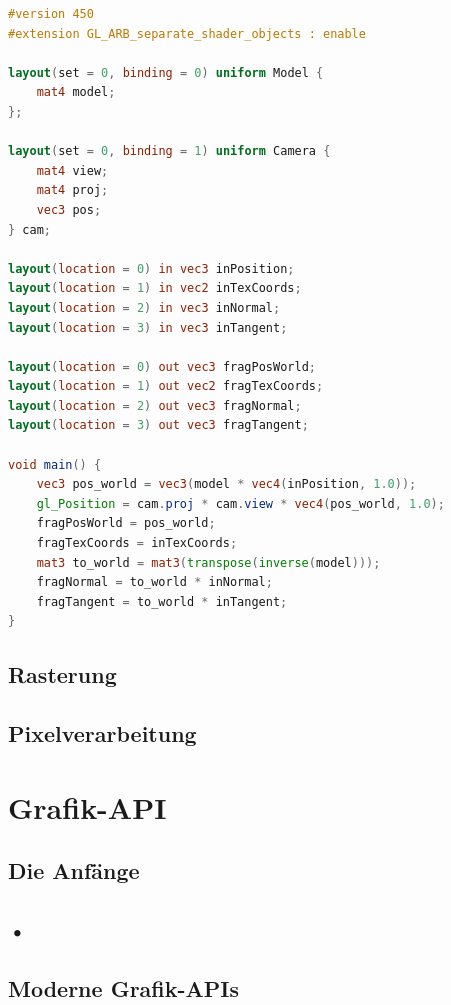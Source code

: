 \documentclass[oneside]{ausarbeitung}
\newcommand*{\quotize}[1]{\glqq #1\grqq}
\begin{document}
\begin{minipage}{\textwidth}
\begin{lstlisting}[language=GLSL, label={lst:vertex_shader}, caption={Beispiel eines Vertex Shaders in \ac{GLSL}, welcher so in der \textbf{spider}-Engine verwendet wird}]
#version 450
#extension GL_ARB_separate_shader_objects : enable

layout(set = 0, binding = 0) uniform Model {
    mat4 model;
};

layout(set = 0, binding = 1) uniform Camera {
    mat4 view;
    mat4 proj;
    vec3 pos;
} cam;

layout(location = 0) in vec3 inPosition;
layout(location = 1) in vec2 inTexCoords;
layout(location = 2) in vec3 inNormal;
layout(location = 3) in vec3 inTangent;

layout(location = 0) out vec3 fragPosWorld;
layout(location = 1) out vec2 fragTexCoords;
layout(location = 2) out vec3 fragNormal;
layout(location = 3) out vec3 fragTangent;

void main() {
    vec3 pos_world = vec3(model * vec4(inPosition, 1.0));
    gl_Position = cam.proj * cam.view * vec4(pos_world, 1.0);
    fragPosWorld = pos_world;
    fragTexCoords = inTexCoords;
    mat3 to_world = mat3(transpose(inverse(model)));
    fragNormal = to_world * inNormal;
    fragTangent = to_world * inTangent;
}
\end{lstlisting}
\end{minipage}
\subsection{Rasterung}

\subsection{Pixelverarbeitung}


\section{Grafik-API}
\subsection{Die Anfänge}
\subsection{•}
\subsection{\quotize{Moderne} Grafik-APIs}
\end{document}
